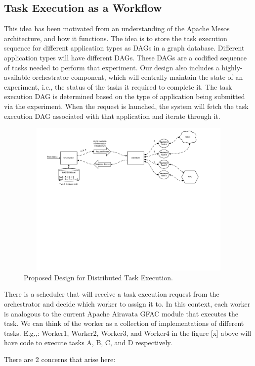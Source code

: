 \documentclass[sigconf]{acmart}
\begin{document}
\subsection{Task Execution as a Workflow}
This idea has been motivated from an understanding of the Apache Mesos \cite{apacheMesos} architecture, and how it functions. The idea is to store the task execution sequence for different application types as DAGs in a graph database. Different application types will have different DAGs. These DAGs are a codified sequence of tasks needed to perform that experiment.  Our design also includes a highly-available orchestrator component, which will centrally maintain the state of an experiment, i.e., the status of the tasks it required to complete it. The task execution DAG is determined based on the type of application being submitted via the experiment.  When the request is launched, the system will fetch the task execution DAG associated with that application and iterate through it.

\begin{figure}
\includegraphics[height=3in, width=7in]{figures/overall-design.pdf}
\caption{Proposed Design for Distributed Task Execution.}
\end{figure}

There is a scheduler that will receive a task execution request from the orchestrator and decide which worker to assign it to. In this context, each worker  is analogous to the current Apache Airavata GFAC module that executes the task. We can think of the worker as a collection of implementations of different tasks. E.g.,: Worker1, Worker2, Worker3, and Worker4 in the figure [x] above will have code to execute tasks A, B, C, and D respectively.

There are 2 concerns that arise here:
\end{document}
